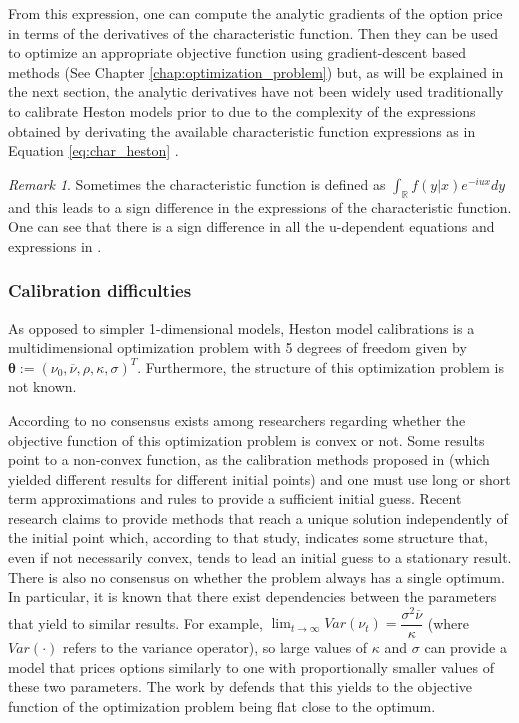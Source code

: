 \documentclass[12,twoside]{mammeTFM}
\theoremstyle{definition}
\theoremstyle{remark}
\newtheorem{remark}[thm]{Remark}
\newcommand{\R}{\ensuremath{\mathbb{R}}}
\begin{document}
From this expression, one can compute the analytic gradients of the option price in terms of the derivatives of the characteristic function. Then they can be used to optimize an appropriate objective function using gradient-descent based methods (See Chapter \ref{chap:optimization_problem}) but, as will be explained in the next section, the analytic derivatives have not been widely used traditionally to calibrate Heston models prior to \cite{cui17} due to the complexity of the expressions obtained by derivating the available characteristic function expressions as in Equation \ref{eq:char_heston}  \cite{cui17}.

\begin{remark}
Sometimes the characteristic function is defined as $\int_{\R} f(y | x) e^{-iux} dy$ and this leads to a sign difference in the expressions of the characteristic function. One can see that there is a sign difference in all the u-dependent equations and expressions in \cite{cui17}.
\end{remark}

\subsubsection{Calibration difficulties} \label{subsec:calibration_difficulties}
As opposed to simpler 1-dimensional models, Heston model calibrations is a multidimensional optimization problem with 5 degrees of freedom given by $\boldsymbol{\theta} := (\nu_0, \overline{\nu}, \rho, \kappa, \sigma)^T$. Furthermore, the structure of this optimization problem is not known.

According to \cite{cui17} no consensus exists among researchers regarding whether the objective function of this optimization problem is convex or not. Some results point to a non-convex function, as the calibration methods proposed in \cite{che07, mik03} (which yielded different results for different initial points) and one must use long or short term approximations and rules to provide a sufficient initial guess. Recent research claims to provide methods that reach a unique solution independently of the initial point \cite{ge12} which, according to that study, indicates some structure that, even if not necessarily convex, tends to lead an initial guess to a stationary result.
There is also no consensus on whether the problem always has a single  optimum. In particular, it is known that there exist dependencies between the parameters that yield to similar results. For example, $\lim_{t \rightarrow \infty} Var(\nu_t) = \dfrac{\sigma^2 \overline{\nu}}{\kappa}$ (where $Var(\cdot)$ refers to the variance operator), so large values of $\kappa$ and $\sigma$ can provide a model that prices options similarly to one with proportionally smaller values of these two parameters. The work by \cite{cui17} defends that this yields to the objective function of the optimization problem being flat close to the optimum.
\end{document}
